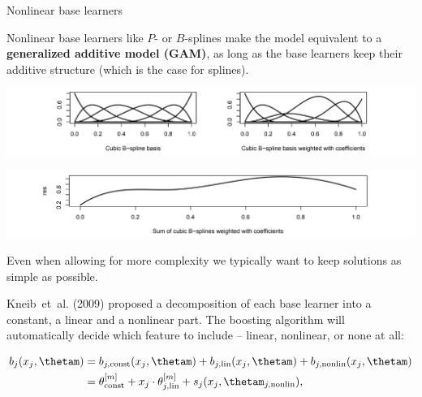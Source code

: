 
\begin{vbframe}{Nonlinear base learners}

Nonlinear base learners like $P$- or $B$-splines make the model equivalent to a
\textbf{generalized additive model (GAM)}, as long as the base learners keep 
their additive structure (which is the case for splines).
\vspace{0.5cm}

\vfill

\begin{center}
\includegraphics[width=1\textwidth]{figure_man/NBL01.png}
\end{center}

\vfill

\begin{center}
\includegraphics[width=1\textwidth]{figure_man/NBL02.png}
\end{center}

\framebreak


Even when allowing for more complexity we typically want to keep solutions as 
simple as possible.

\lz

Kneib~et~al. (2009) proposed a decomposition of each base learner into a 
constant, a linear and a nonlinear part. 
The boosting algorithm will automatically decide which feature to include -- 
linear, nonlinear, or none at all:

\vspace{-0.5cm}

\begin{align*}
b_j(x_j, \thetam) & = b_{j, \text{const}}(x_j, \thetam) + b_{j, \text{lin}}
(x_j, \thetam) + b_{j, \text{nonlin}}(x_j, \thetam)\\
 & = \theta^{[m]}_\text{const} + x_j \cdot \theta^{[m]}_{j, \text{lin}} + 
 s_j(x_j, \thetam_{j,\text{nonlin}}),
\end{align*}


\end{vbframe}
